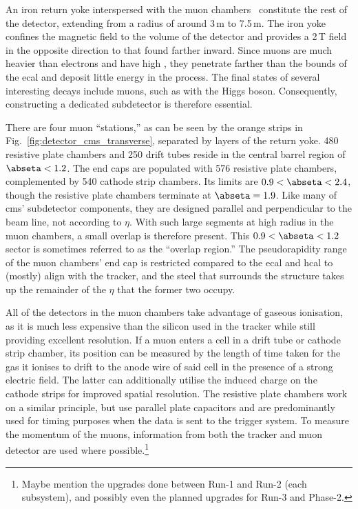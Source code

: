 An iron return yoke interspersed with the muon chambers~\cite{Layter:343814} constitute the rest of the detector, extending from a radius of around 3\,m to 7.5\,m. The iron yoke confines the magnetic field to the volume of the detector and provides a 2\,T field in the opposite direction to that found farther inward. Since muons are much heavier than electrons and have high \pt, they penetrate farther than the bounds of the \acrshort{ecal} and deposit little energy in the process. The final states of several interesting decays include muons, such as with the Higgs boson. Consequently, constructing a dedicated subdetector is therefore essential.

There are four muon ``stations,'' as can be seen by the orange strips in Fig.~\ref{fig:detector_cms_transverse}, separated by layers of the return yoke. 480 resistive plate chambers and 250 drift tubes reside in the central barrel region of $\abseta < \text{1.2}$. The end caps are populated with 576 resistive plate chambers, complemented by 540 cathode strip chambers. Its limits are $\text{0.9} < \abseta < \text{2.4}$, though the resistive plate chambers terminate at $\abseta = \text{1.9}$. Like many of \acrshort{cms}' subdetector components, they are designed parallel and perpendicular to the beam line, not according to $\eta$. With such large segments at high radius in the muon chambers, a small overlap is therefore present. This $\text{0.9} < \abseta < \text{1.2}$ sector is sometimes referred to as the ``overlap region.'' The pseudorapidity range of the muon chambers' end cap is restricted compared to the \acrshort{ecal} and \acrshort{hcal} to (mostly) align with the tracker, and the steel that surrounds the structure takes up the remainder of the $\eta$ that the former two occupy.

All of the detectors in the muon chambers take advantage of gaseous ionisation, as it is much less expensive than the silicon used in the tracker while still providing excellent resolution. If a muon enters a cell in a drift tube or cathode strip chamber, its position can be measured by the length of time taken for the gas it ionises to drift to the anode wire of said cell in the presence of a strong electric field. The latter can additionally utilise the induced charge on the cathode strips for improved spatial resolution. The resistive plate chambers work on a similar principle, but use parallel plate capacitors and are predominantly used for timing purposes when the data is sent to the trigger system. To measure the momentum of the muons, information from both the tracker and muon detector are used where possible.\footnote{Maybe mention the upgrades done between Run-1 and Run-2 (each subsystem), and possibly even the planned upgrades for Run-3 and Phase-2.}

